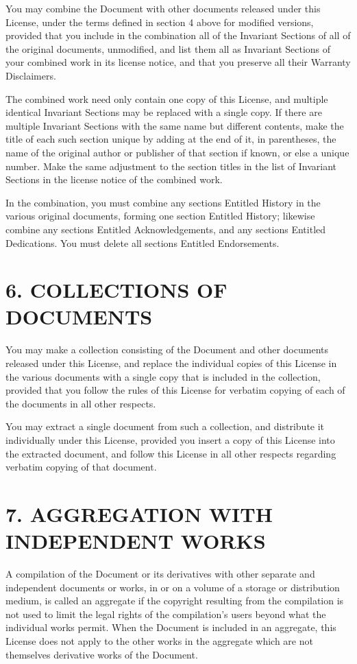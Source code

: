 \documentclass[captions=tableheading]{scrbook}
\begin{document}
\begin{example}
You may combine the Document with other documents released under this License, under the terms defined in section 4 above for modified versions, provided that you include in the combination all of the Invariant Sections of all of the original documents, unmodified, and list them all as Invariant Sections of your combined work in its license notice, and that you preserve all their Warranty Disclaimers.

The combined work need only contain one copy of this License, and multiple identical Invariant Sections may be replaced with a single copy. If there are multiple Invariant Sections with the same name but different contents, make the title of each such section unique by adding at the end of it, in parentheses, the name of the original author or publisher of that section if known, or else a unique number. Make the same adjustment to the section titles in the list of Invariant Sections in the license notice of the combined work.

In the combination, you must combine any sections Entitled History in the various original documents, forming one section Entitled History;
likewise combine any sections Entitled Acknowledgements, and any sections Entitled Dedications. You must delete all sections Entitled Endorsements.
\section{6. COLLECTIONS OF DOCUMENTS}
\label{sec-18-7}


You may make a collection consisting of the Document and other documents released under this License, and replace the individual copies of this License in the various documents with a single copy that is included in the collection, provided that you follow the rules of this License for verbatim copying of each of the documents in all other respects. 

You may extract a single document from such a collection, and distribute it individually under this License, provided you insert a copy of this License into the extracted document, and follow this License in all other respects regarding verbatim copying of that document.
\section{7. AGGREGATION WITH INDEPENDENT WORKS}
\label{sec-18-8}


A compilation of the Document or its derivatives with other separate and independent documents or works, in or on a volume of a storage or distribution medium, is called an aggregate if the copyright resulting from the compilation is not used to limit the legal rights of the compilation's users beyond what the individual works permit. When the Document is included in an aggregate, this License does not apply to the other works in the aggregate which are not themselves derivative works of the Document.


\end{example}
\end{document}
